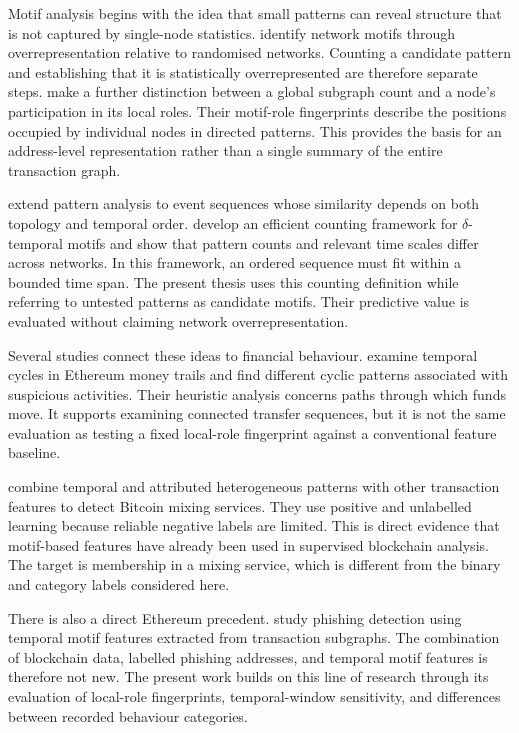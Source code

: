 \documentclass{thesisclass}
\begin{document}
Motif analysis begins with the idea that small patterns can reveal structure
that is not captured by single-node statistics.
\citet{milo2002network} identify network motifs through overrepresentation
relative to randomised networks. Counting a candidate pattern and establishing
that it is statistically overrepresented are therefore separate steps.
\citet{McDonnell2014} make a further distinction between a global subgraph
count and a node's participation in its local roles. Their motif-role
fingerprints describe the positions occupied by individual nodes in directed
patterns. This provides the basis for an address-level representation rather
than a single summary of the entire transaction graph.

\citet{kovanen2011temporal} extend pattern analysis to event sequences whose
similarity depends on both topology and temporal order.
\citet{paranjape2017motifs} develop an efficient counting framework for
$\delta$-temporal motifs and show that pattern counts and relevant time scales
differ across networks. In this framework, an ordered sequence must fit within
a bounded time span. The present thesis uses this counting definition while
referring to untested patterns as candidate motifs. Their predictive value is
evaluated without claiming network overrepresentation.

Several studies connect these ideas to financial behaviour.
\citet{lal2021money} examine temporal cycles in Ethereum money trails and find
different cyclic patterns associated with suspicious activities. Their
heuristic analysis concerns paths through which funds move. It supports
examining connected transfer sequences, but it is not the same evaluation as
testing a fixed local-role fingerprint against a conventional feature baseline.

\citet{wu2022mixing} combine temporal and attributed heterogeneous patterns
with other transaction features to detect Bitcoin mixing services. They use
positive and unlabelled learning because reliable negative labels are limited.
This is direct evidence that motif-based features have already been used in
supervised blockchain analysis. The target is membership in a mixing service,
which is different from the binary and category labels considered here.

There is also a direct Ethereum precedent.
\citet{wang2023temporal} study phishing detection using temporal motif
features extracted from transaction subgraphs. The combination of blockchain
data, labelled phishing addresses, and temporal motif features is therefore
not new. The present work builds on this line of research through its
evaluation of local-role fingerprints, temporal-window sensitivity, and
differences between recorded behaviour categories.
\end{document}
